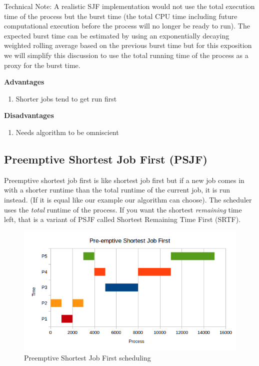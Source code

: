 Technical Note: A realistic SJF implementation would not use the total execution time of the process but the burst time (the total CPU time including future computational execution before the process will no longer be ready to run). The expected burst time can be estimated by using an exponentially decaying weighted rolling average based on the previous burst time but for this exposition we will simplify this discussion to use the total running time of the process as a proxy for the burst time.

\textbf{Advantages}

\begin{enumerate}
  \item Shorter jobs tend to get run first
\end{enumerate}

\textbf{Disadvantages}
\begin{enumerate}
  \item Needs algorithm to be omniscient
\end{enumerate}

\subsection{Preemptive Shortest Job First (PSJF)}

Preemptive shortest job first is like shortest job first but if a new job comes in with a shorter runtime than the total runtime of the current job, it is run instead. (If it is equal like our example our algorithm can choose). The scheduler uses the \emph{total} runtime of the process. If you want the shortest \emph{remaining} time left, that is a variant of PSJF called Shortest Remaining Time First (SRTF).

\begin{figure}[htbp]
\centering
\includegraphics[width=\textwidth]{scheduling/images/psjf.png}
\caption{Preemptive Shortest Job First scheduling}
\end{figure}


